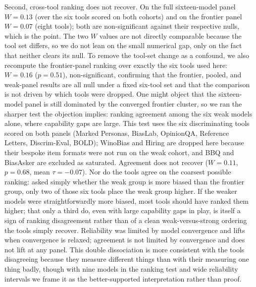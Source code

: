 \documentclass[11pt]{article}
\begin{document}
Second, cross-tool ranking does not recover. On the full sixteen-model panel $W=0.13$ (over the six tools scored on both cohorts) and on the frontier panel $W=0.07$ (eight tools); both are non-significant against their respective nulls, which is the point. The two $W$ values are not directly comparable because the tool set differs, so we do not lean on the small numerical gap, only on the fact that neither clears its null. To remove the tool-set change as a confound, we also recompute the frontier-panel ranking over exactly the six tools used here: $W=0.16$ ($p=0.51$), non-significant, confirming that the frontier, pooled, and weak-panel results are all null under a fixed six-tool set and that the comparison is not driven by which tools were dropped. One might object that the sixteen-model panel is still dominated by the converged frontier cluster, so we ran the sharper test the objection implies: ranking agreement among the six weak models alone, where capability gaps are large. This test uses the six discriminating tools scored on both panels (Marked Personas, BiasLab, OpinionQA, Reference Letters, Discrim-Eval, BOLD); WinoBias and Hiring are dropped here because their bespoke item formats were not run on the weak cohort, and BBQ and BiasAsker are excluded as saturated. Agreement does not recover ($W=0.11$, $p=0.68$, mean $\tau=-0.07$). Nor do the tools agree on the coarsest possible ranking: asked simply whether the weak group is more biased than the frontier group, only two of those six tools place the weak group higher. If the weaker models were straightforwardly more biased, most tools should have ranked them higher; that only a third do, even with large capability gaps in play, is itself a sign of ranking disagreement rather than of a clean weak-versus-strong ordering the tools simply recover. Reliability was limited by model convergence and lifts when convergence is relaxed; agreement is not limited by convergence and does not lift at any panel. This double dissociation is more consistent with the tools disagreeing because they measure different things than with their measuring one thing badly, though with nine models in the ranking test and wide reliability intervals we frame it as the better-supported interpretation rather than proof.
\end{document}
